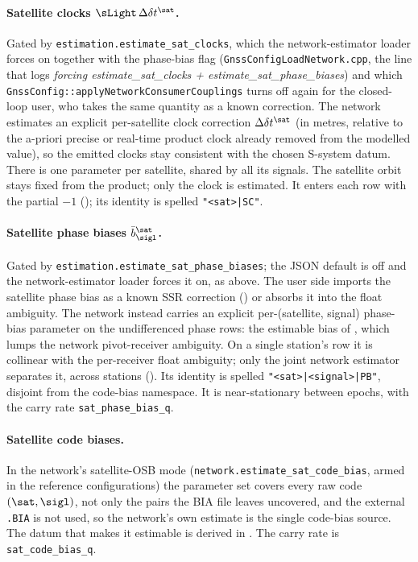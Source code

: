 \paragraph{Satellite clocks $\sLight\,\Delta\delta t^\sat$.}
Gated by \texttt{estimation.estimate\_sat\_clocks}, which the
network-estimator loader forces on together with the phase-bias flag
(\texttt{GnssConfigLoadNetwork.cpp}, the line that logs
\emph{forcing estimate\_sat\_clocks + estimate\_sat\_phase\_biases}) and
which \texttt{GnssConfig::applyNetworkConsumerCouplings} turns off again for
the closed-loop user, who takes the same quantity as a known correction.  The
network estimates an explicit per-satellite clock correction
$\Delta\delta t^\sat$ (in metres, relative to the a-priori precise or
real-time product clock already removed from the modelled value), so
the emitted clocks stay consistent with the chosen S-system datum.  There
is one parameter per satellite, shared by all its signals.  The satellite orbit
stays fixed from the product; only the clock is estimated.  It enters each
row with the partial $-1$ (); its identity is spelled
\texttt{"<sat>|SC"}.

\paragraph{Satellite phase biases $\bar b^\sat_\sigl$.}
Gated by \texttt{estimation.estimate\_sat\_phase\_biases}; the JSON
default is off and the network-estimator loader forces it on, as above.  The
user side imports the satellite phase bias as a known SSR correction
() or absorbs it into the float
ambiguity.  The network instead carries an explicit per-(satellite, signal)
phase-bias parameter on the undifferenced phase rows: the estimable bias of
\textcite{odijk2003fast}, which lumps the network pivot-receiver ambiguity.
On a single station's row it is collinear with the per-receiver float
ambiguity; only the joint network estimator separates it, across stations
().  Its identity is spelled \texttt{"<sat>|<signal>|PB"},
disjoint from the code-bias namespace.  It is near-stationary between epochs,
with the carry rate \texttt{sat\_phase\_bias\_q}.

\paragraph{Satellite code biases.}
In the network's satellite-OSB mode (\texttt{network.estimate\_sat\_code\_bias},
armed in the reference configurations) the parameter set covers every raw code
$(\sat,\sigl)$, not only the pairs the BIA file leaves uncovered, and the
external \texttt{.BIA} is not used, so the network's own estimate is the
single code-bias source.  The datum that makes it estimable is derived in
.  The carry rate is
\texttt{sat\_code\_bias\_q}.

